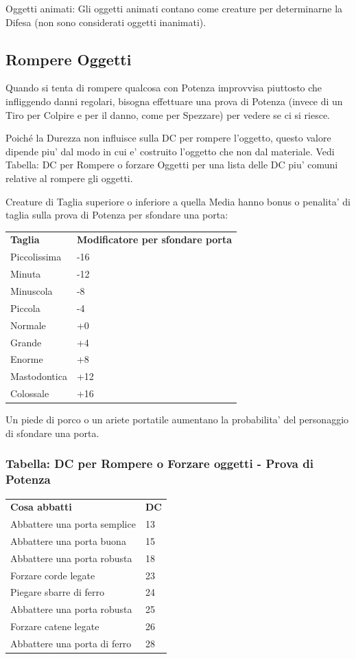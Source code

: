 \documentclass[a4paper,11pt,twoside,openany]{book}
\begin{document}
{Oggetti animati: Gli oggetti animati contano come creature per determinarne
la Difesa (non sono considerati oggetti inanimati).

\subsection{Rompere Oggetti}

\label{rompere-oggetti}

Quando si tenta di rompere qualcosa con Potenza improvvisa piuttosto che infliggendo danni regolari, bisogna effettuare una prova di Potenza (invece di un Tiro per Colpire e per il danno, come per Spezzare) per vedere se ci si riesce. 

Poiché la Durezza non influisce sulla DC per rompere l'oggetto, questo valore dipende piu' dal modo in cui e' costruito l'oggetto che non dal materiale. Vedi Tabella: DC per Rompere o forzare Oggetti per una lista delle DC piu' comuni relative al rompere gli oggetti.

Creature di Taglia superiore o inferiore a quella Media hanno bonus o penalita' di taglia sulla prova di Potenza per sfondare una porta:

\bigskip

\begin{tabular}{ll}
\toprule
\textbf{Taglia} & \textbf{Modificatore per sfondare porta}\tabularnewline
Piccolissima & -16\tabularnewline
Minuta & -12\tabularnewline
Minuscola & -8\tabularnewline
Piccola & -4\tabularnewline
Normale & +0\tabularnewline
Grande & +4\tabularnewline
Enorme & +8\tabularnewline
Mastodontica & +12\tabularnewline
Colossale & +16\tabularnewline
\end{tabular}

\bigskip

Un piede di porco o un ariete portatile aumentano la probabilita' del personaggio di sfondare una porta.

\subsubsection{Tabella: DC per Rompere o Forzare oggetti - Prova di Potenza}

\label{tabella-dc-per-rompere-o-forzare-oggetti---prova-di-potenza}
\bigskip

\begin{tabular}{ll}
\toprule
\textbf{Cosa abbatti} & \textbf{DC}\tabularnewline
Abbattere una porta semplice & 13\tabularnewline
Abbattere una porta buona & 15\tabularnewline
Abbattere una porta robusta & 18\tabularnewline
Forzare corde legate & 23\tabularnewline
Piegare sbarre di ferro & 24\tabularnewline
Abbattere una porta robusta & 25\tabularnewline
Forzare catene legate & 26\tabularnewline
Abbattere una porta di ferro & 28\tabularnewline
\end{tabular}
\bigskip

}
\end{document}
